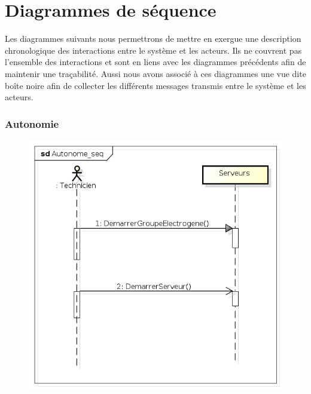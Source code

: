 \documentclass[11pt, titlepage]{report}
\begin{document}
\clearpage
\section{Diagrammes de séquence}
Les diagrammes suivants nous permettrons de mettre en exergue une description chronologique des interactions entre le système et  les acteurs. Ils ne couvrent pas l'ensemble des interactions et sont en liens avec les diagrammes précédents afin de maintenir une traçabilité. Aussi nous avons associé à ces diagrammes une  vue dite boîte noire afin de collecter les différents messages transmis entre le système et les acteurs.
\subsubsection{Autonomie}
\begin{figure}[h!]
\begin{center}
\includegraphics[scale=.4]{../images/diagrammes/sysml/sequence/autonome.png} 

\end{center}
\end{figure}
\end{document}
